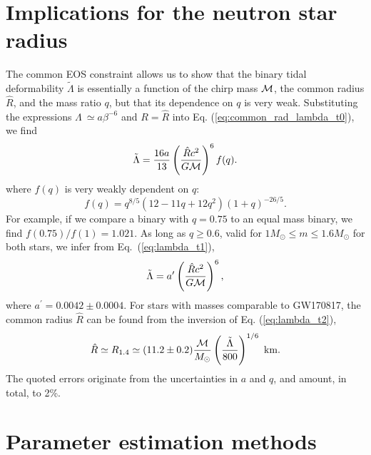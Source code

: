 \section{Implications for the neutron star radius}

The common EOS constraint allows us to show that the binary tidal deformability $\tilde\Lambda$ is essentially a function of the chirp mass ${\cal{M}}$, the common radius $\hat R$, and the mass ratio $q$, but that its dependence on $q$ is very weak. Substituting the expressions $\Lambda~\simeq a\beta^{-6}$ and $R=\hat R$ into Eq. (\ref{eq:common_rad_lambda_t0}), we find
\begin{equation}
\tilde{\Lambda}=
\frac{16a}{13}
\left(
\frac{\hat{R}c^2}{G{\cal M}}
\right)^6 f(q).
\label{eq:lambda_t1}\end{equation}
where $f(q)$ is very weakly dependent on $q$:
\begin{equation}
f(q)=q^{8/5}(12-11q+12q^2)(1+q)^{-26/5}.
\end{equation}
For example, if we compare a binary with $q = 0.75$ to an equal mass binary, we find $f(0.75)/f(1)=1.021$. As long as $q\ge0.6$, valid for $1M_\odot\le m\le 1.6 M_\odot$ for both stars, we infer from Eq.~(\ref{eq:lambda_t1}),
\begin{equation}
\tilde{\Lambda}=a^\prime\left(\frac{\hat{R}c^2}{G{\cal M}}\right)^6,
\label{eq:lambda_t2}\end{equation}
where $a^\prime=0.0042\pm0.0004$.
For stars with masses comparable to GW170817, the common radius $\hat R$ can be found from the inversion of Eq. (\ref{eq:lambda_t2}),
\begin{equation}
\hat R\simeq R_{1.4}\simeq (11.2\pm0.2)\frac{\cal M}{M_\odot}\left(\frac{\tilde{\Lambda}}{800}\right)^{1/6}{\rm~km}.
\label{eq:rhat}\end{equation}
The quoted errors originate from the uncertainties in $a$ and $q$, and amount, in total, to 2\%.

\section{Parameter estimation methods}

